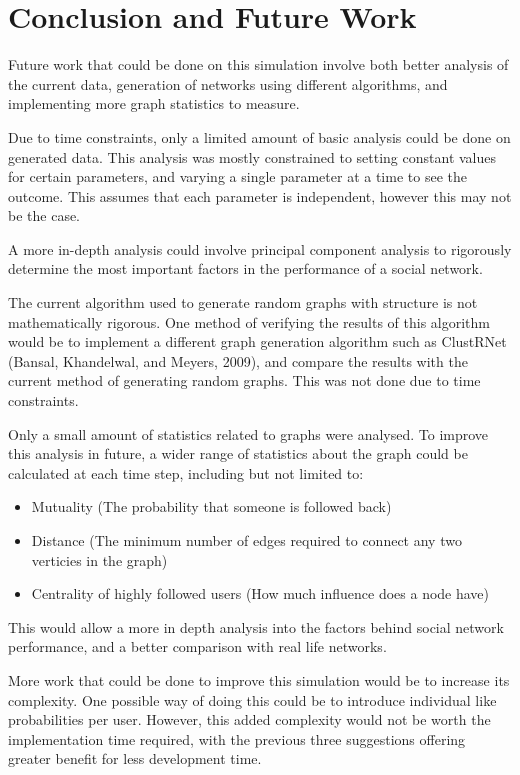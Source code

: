 \documentclass{article}
\begin{document}
\section{Conclusion and Future Work}

Future work that could be done on this simulation involve both better
analysis of the current data, generation of networks using different algorithms,
and implementing more graph statistics to measure.

Due to time constraints, only a limited amount of basic analysis could be done
on generated data. This analysis was mostly constrained to setting constant values for certain
parameters, and varying a single parameter at a time to see the outcome.
This assumes that each parameter is independent, however this may not be the case.

A more in-depth analysis could involve principal component analysis to rigorously
determine the most important factors in the performance of a social network.

The current algorithm used to generate random graphs with structure is not mathematically rigorous.
One method of verifying the results of this algorithm would be to implement a different
graph generation algorithm such as ClustRNet (Bansal, Khandelwal, and Meyers, 2009),
and compare the results with the current method of generating random graphs.
This was not done due to time constraints.

Only a small amount of statistics related to graphs were analysed. To improve this
analysis in future, a wider range of statistics about the graph could be calculated at each time step,
including but not limited to:
\begin{itemize}
\item Mutuality (The probability that someone is followed back)
\item Distance (The minimum number of edges required to connect any two verticies in the graph)
\item Centrality of highly followed users (How much influence does a node have)
\end{itemize}
This would allow a more in depth analysis into the factors behind social network performance, and a better
comparison with real life networks.

More work that could be done to improve this simulation would be to increase
its complexity. One possible way of doing this could be to introduce
individual like probabilities per user. However,
this added complexity would not be worth the implementation time required,
with the previous three suggestions offering greater benefit for less development
time.
\end{document}
